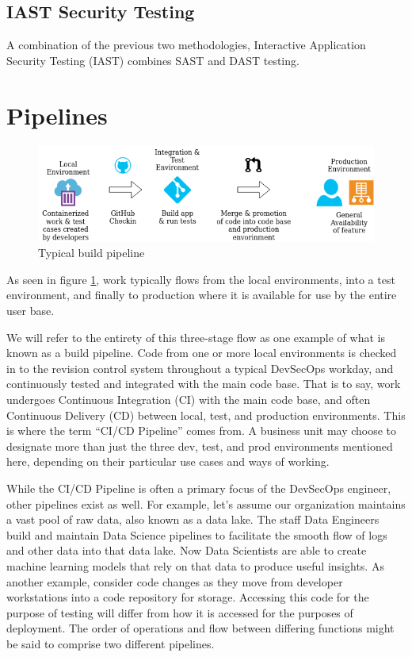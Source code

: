\subsection{IAST Security Testing}

\justifying
A combination of the previous two methodologies, Interactive Application Security Testing (IAST) combines
SAST and DAST testing.

\section{Pipelines}

\begin{figure}[!htb]
\centering
\includegraphics[scale=0.63]{images/flow.png}
\caption{Typical build pipeline}
\label{pipeline}
\end{figure}

\justifying
As seen in figure \ref{pipeline}, work typically flows from the local environments, into a test
environment, and finally to production where it is available for use by the entire user base.

\justifying
We will refer to the entirety of this three-stage flow as one example of what is known as a build pipeline.
Code from one or more local environments is checked in to the revision control system throughout a
typical DevSecOps workday, and continuously tested and integrated with the main code base. That is to say, work undergoes
Continuous Integration (CI) with the main code base,
and often Continuous Delivery (CD) between local, test, and production environments. This is
where the term ``CI/CD Pipeline'' comes from. A business unit may choose to designate more than just the three dev, test,
and prod environments mentioned here, depending on their particular use cases and ways of working.

\justifying
While the CI/CD Pipeline is often a primary focus of the DevSecOps engineer, other pipelines exist as well. For example,
let's assume our organization maintains a vast pool of raw data, also known as a data lake. The staff Data
Engineers build and maintain Data Science pipelines to facilitate the smooth flow
of logs and other data into that data lake. Now Data Scientists are able to create machine learning models that rely on that
data to produce useful insights. As another example, consider code changes as they move from
developer workstations into a code repository for storage. Accessing this code for the purpose of testing will differ from
how it is accessed for the purposes of deployment. The order of operations and flow
between differing functions might be said to comprise two different pipelines.

